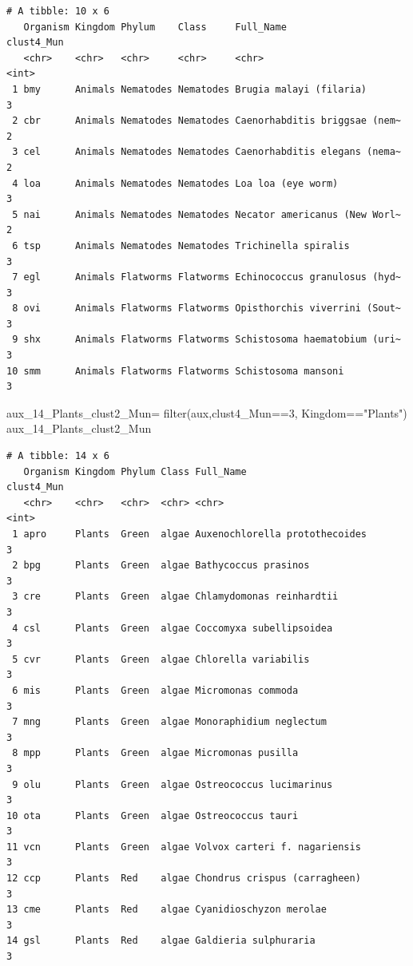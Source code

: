 \documentclass[
  letterpaper,
  DIV=11,
  numbers=noendperiod]{scrreprt}
\newenvironment{Shaded}{}{}
\newcommand{\DecValTok}[1]{\textcolor[rgb]{0.82,0.60,0.40}{#1}}
\newcommand{\FunctionTok}[1]{\textcolor[rgb]{0.38,0.69,0.94}{#1}}
\newcommand{\NormalTok}[1]{\textcolor[rgb]{0.67,0.70,0.75}{#1}}
\newcommand{\OtherTok}[1]{\textcolor[rgb]{0.15,0.68,0.38}{#1}}
\newcommand{\SpecialCharTok}[1]{\textcolor[rgb]{0.34,0.71,0.76}{#1}}
\newcommand{\StringTok}[1]{\textcolor[rgb]{0.60,0.76,0.47}{#1}}
\begin{document}
\begin{verbatim}
# A tibble: 10 x 6
   Organism Kingdom Phylum    Class     Full_Name                     clust4_Mun
   <chr>    <chr>   <chr>     <chr>     <chr>                              <int>
 1 bmy      Animals Nematodes Nematodes Brugia malayi (filaria)                3
 2 cbr      Animals Nematodes Nematodes Caenorhabditis briggsae (nem~          2
 3 cel      Animals Nematodes Nematodes Caenorhabditis elegans (nema~          2
 4 loa      Animals Nematodes Nematodes Loa loa (eye worm)                     3
 5 nai      Animals Nematodes Nematodes Necator americanus (New Worl~          2
 6 tsp      Animals Nematodes Nematodes Trichinella spiralis                   3
 7 egl      Animals Flatworms Flatworms Echinococcus granulosus (hyd~          3
 8 ovi      Animals Flatworms Flatworms Opisthorchis viverrini (Sout~          3
 9 shx      Animals Flatworms Flatworms Schistosoma haematobium (uri~          3
10 smm      Animals Flatworms Flatworms Schistosoma mansoni                    3
\end{verbatim}

\begin{Shaded}
\begin{Highlighting}[]
\NormalTok{aux\_14\_Plants\_clust2\_Mun}\OtherTok{=} \FunctionTok{filter}\NormalTok{(aux,clust4\_Mun}\SpecialCharTok{==}\DecValTok{3}\NormalTok{,}
\NormalTok{                             Kingdom}\SpecialCharTok{==}\StringTok{"Plants"}\NormalTok{)}
\NormalTok{aux\_14\_Plants\_clust2\_Mun}
\end{Highlighting}
\end{Shaded}

\begin{verbatim}
# A tibble: 14 x 6
   Organism Kingdom Phylum Class Full_Name                      clust4_Mun
   <chr>    <chr>   <chr>  <chr> <chr>                               <int>
 1 apro     Plants  Green  algae Auxenochlorella protothecoides          3
 2 bpg      Plants  Green  algae Bathycoccus prasinos                    3
 3 cre      Plants  Green  algae Chlamydomonas reinhardtii               3
 4 csl      Plants  Green  algae Coccomyxa subellipsoidea                3
 5 cvr      Plants  Green  algae Chlorella variabilis                    3
 6 mis      Plants  Green  algae Micromonas commoda                      3
 7 mng      Plants  Green  algae Monoraphidium neglectum                 3
 8 mpp      Plants  Green  algae Micromonas pusilla                      3
 9 olu      Plants  Green  algae Ostreococcus lucimarinus                3
10 ota      Plants  Green  algae Ostreococcus tauri                      3
11 vcn      Plants  Green  algae Volvox carteri f. nagariensis           3
12 ccp      Plants  Red    algae Chondrus crispus (carragheen)           3
13 cme      Plants  Red    algae Cyanidioschyzon merolae                 3
14 gsl      Plants  Red    algae Galdieria sulphuraria                   3
\end{verbatim}
\end{document}
